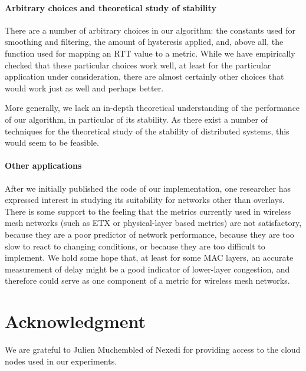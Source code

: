\documentclass[conference,letterpaper]{IEEEtran}
\begin{document}
\paragraph{Arbitrary choices and theoretical study of stability}

There are a number of arbitrary choices in our algorithm: the
constants used for smoothing and filtering, the amount of hysteresis
applied, and, above all, the function used for mapping an RTT value to
a metric.  While we have empirically checked that these particular
choices work well, at least for the particular application under
consideration, there are almost certainly other choices that would
work just as well and perhaps better.

More generally, we lack an in-depth theoretical understanding of the
performance of our algorithm, in particular of its stability.  As
there exist a number of techniques for the theoretical study of the
stability of distributed systems, this would seem to be feasible.

\paragraph{Other applications}

After we initially published the code of our implementation, one
researcher has expressed interest in studying its suitability for
networks other than overlays.  There is some support to the feeling
that the metrics currently used in wireless mesh networks (such as ETX
\cite{etx} or physical-layer based metrics) are not satisfactory,
because they are a poor predictor of network performance, because they
are too slow to react to changing conditions, or because they are too
difficult to implement.  We hold some hope that, at least for some MAC
layers, an accurate measurement of delay might be a good indicator of
lower-layer congestion, and therefore could serve as one component of
a metric for wireless mesh networks.

\section*{Acknowledgment}

We are grateful to Julien Muchembled of Nexedi for providing access to
the cloud nodes used in our experiments.
\end{document}
